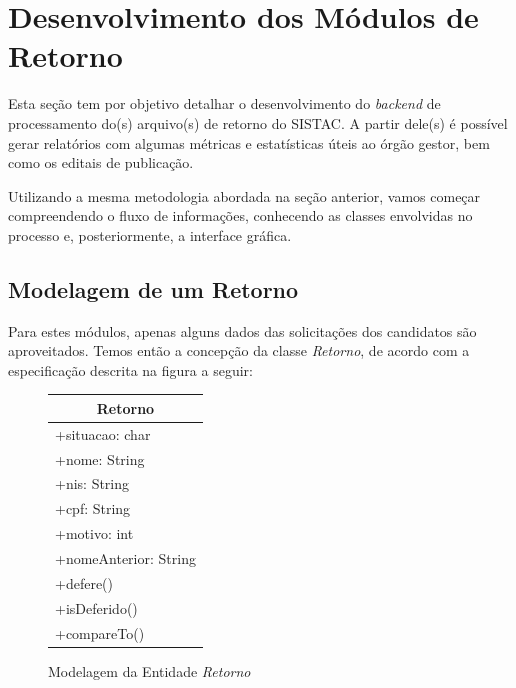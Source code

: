 \documentclass[
	12pt,			%
	openright,		%
	oneside,	
	a4paper,		%
	english,		%
	brazil			%
]{abntex2/abntex2}  %
\begin{document}
		\section{Desenvolvimento dos Módulos de Retorno}
	
			Esta seção tem por objetivo detalhar o desenvolvimento do \textit{backend} de processamento do(s) arquivo(s) de retorno do SISTAC. A partir dele(s) é possível gerar relatórios com algumas métricas e estatísticas úteis ao órgão gestor, bem como os editais de publicação.
	
			Utilizando a mesma metodologia abordada na seção anterior, vamos começar compreendendo o fluxo de informações, conhecendo as classes envolvidas no processo e, posteriormente, a interface gráfica.
	
			\subsection{Modelagem de um Retorno}
	
				Para estes módulos, apenas alguns dados das solicitações dos candidatos são aproveitados. Temos então a concepção da classe \textit{Retorno}, de acordo com a especificação descrita na figura a seguir:
	
				\begin{figure}[ht]
					\begin{center}
						
						\caption{Modelagem da Entidade \textit{Retorno}}
						\label{retorno-uml}
							
						\begin{tabular}{|l|}
							\hline
							\multicolumn{1}{|c|}{\textbf{Retorno}} \\ \hline
							+situacao: char                        \\
							+nome: String                          \\
							+nis: String                           \\
							+cpf: String                           \\
							+motivo: int                           \\
							+nomeAnterior: String                  \\ \hline
							+defere()                              \\
							+isDeferido()                          \\
							+compareTo()                           \\ \hline
						\end{tabular}
						
					\end{center}
				\end{figure}
	
\end{document}
